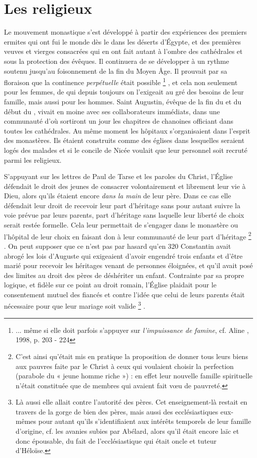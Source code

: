  \section{Les religieux}
 Le mouvement monastique s'est développé à partir des expériences des premiers ermites qui ont fui le monde dès le  dans les déserts d'Égypte, et des premières veuves et vierges consacrées qui en ont fait autant à l'ombre des cathédrales et sous la protection des évêques. Il continuera de se développer à un rythme soutenu jusqu'au foisonnement de la fin du Moyen Âge. Il prouvait par sa floraison que la continence \emph{perpétuelle} était possible%
\footnote{... même si elle doit parfois s'appuyer sur \emph{l'impuissance de famine}, cf. Aline , 1998, p. 203 - 224}%
, et cela non seulement pour les femmes, de qui depuis toujours on l'exigeait au gré des besoins de leur famille, mais aussi pour les hommes. Saint Augustin, évêque de la fin du  et du début du , vivait en moine avec ses collaborateurs immédiats, dans une communauté d'où sortiront un jour les chapitres de chanoines officiant dans toutes les cathédrales. Au même moment les hôpitaux s'organisaient dans l'esprit des monastères. Ils étaient construits comme des églises dans lesquelles seraient logés des malades et si le concile de Nicée voulait que leur personnel soit recruté parmi les religieux.

 S'appuyant sur les lettres de Paul de Tarse et les paroles du Christ, l'Église défendait le droit des jeunes de consacrer volontairement et librement leur vie à Dieu, alors qu'ils étaient encore \emph{dans la main} de leur père. Dans ce cas elle défendait leur droit de recevoir leur part d'héritage sans pour autant suivre la voie prévue par leurs parents, part d'héritage sans laquelle leur liberté de choix serait restée formelle. Cela leur permettait de s'engager dans le monastère ou l'hôpital de leur choix en faisant don à leur communauté de leur part d'héritage%
\footnote{C'est ainsi qu'était mis en pratique la proposition de donner tous leurs biens aux pauvres faite par le Christ à ceux qui voulaient choisir la perfection (parabole du « jeune homme riche ») : en effet leur nouvelle famille spirituelle n'était constituée que de membres qui avaient fait vœu de pauvreté.}%
. On peut supposer que ce n'est pas par hasard qu'en 320 Constantin avait abrogé les lois d'Auguste qui exigeaient d'avoir engendré trois enfants et d'être marié pour recevoir les héritages venant de personnes éloignées, et qu'il avait posé des limites au droit des pères de déshériter un enfant. Contrainte par sa propre logique, et fidèle sur ce point au droit romain, l'Église plaidait pour le consentement mutuel des fiancés et contre l'idée que celui de leurs parents était nécessaire pour que leur mariage soit valide%
\footnote{Là aussi elle allait contre l'autorité des pères. Cet enseignement-là restait en travers de la gorge de bien des pères, mais aussi des ecclésiastiques eux-mêmes pour autant qu'ils s'identifiaient aux intérêts temporels de leur famille d'origine, cf. les avanies subies par Abélard, alors qu'il était encore laïc et donc épousable, du fait de l'ecclésiastique qui était oncle et tuteur d'Héloïse.}%
.

